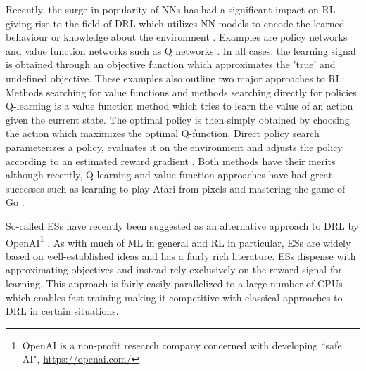 Recently, the surge in popularity of \glspl{NN} has had a significant impact on \gls{RL} giving rise to the field of \gls{DRL} which utilizes \gls{NN} models to encode the learned behaviour or knowledge about the environment \cite{Li2017}. Examples are policy networks \cite{Williams1992, Sehnke2010, Silver2014, Schulman2015, Mnih2016, Schulman2017} and value function networks such as Q networks \cite{Kaelbling1996, Mnih2015}. In all cases, the learning signal is obtained through an objective function which approximates the 'true' and undefined objective. These examples also outline two major approaches to \gls{RL}: Methods searching for value functions and methods searching directly for policies. Q-learning is a value function method which tries to learn the value of an action given the current state. The optimal policy is then simply obtained by choosing the action which maximizes the optimal Q-function. Direct policy search parameterizes a policy, evaluates it on the environment and adjusts the policy according to an estimated reward gradient \cite{Kaelbling1996}. Both methods have their merits although recently, Q-learning and value function approaches have had great successes such as learning to play Atari from pixels \cite{Mnih2015} and mastering the game of Go \cite{Silver2016}.

So-called \glspl{ES} have recently been suggested as an alternative approach to \gls{DRL} by OpenAI\footnote{OpenAI is a non-profit research company concerned with developing ``safe \gls{AI}", \url{https://openai.com/}} \cite{Salimans2017}. As with much of \gls{ML} in general and \gls{RL} in particular, \glspl{ES} are widely based on well-established ideas and has a fairly rich literature. \Glspl{ES} dispense with approximating objectives and instead rely exclusively on the reward signal for learning. This approach is fairly easily parallelized to a large number of \glspl{CPU} which enables fast training making it competitive with classical approaches to \gls{DRL} in certain situations.
